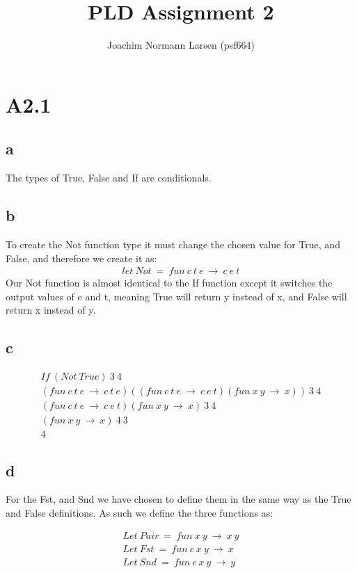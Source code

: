\documentclass[10pt,a4paper]{article}      %
\title{PLD Assignment 2}
\author{Joachim Normann Larsen (psf664)}
\begin{document}
\hfuzz=50pt
\maketitle


\clearpage

\section*{A2.1}
\subsection*{a}
The types of True, False and If are conditionals.

\subsection*{b}
To create the Not function type it must change the chosen value for True, and False, and therefore we create it as:
\begin{align*}
let \ Not \ = \ fun \ c \ t \ e \ \rightarrow \ c \ e \ t
\end{align*}
Our Not function is almost identical to the If function except it switches the output values of e and t, meaning True will return y instead of x, and False will return x instead of y.

\subsection*{c}
\begin{align*}
If \ (Not \ True) \ 3 \ 4 \\
(fun \ c \ t \ e \ \rightarrow \ c \ t \ e)((fun \ c \ t \ e \ \rightarrow \ c \ e \ t)(fun \ x \ y \ \rightarrow \ x)) \ 3 \ 4 \\
(fun \ c \ t \ e \ \rightarrow \ c \ e \ t)(fun \ x \ y \ \rightarrow \ x) \ 3 \ 4 \\
(fun \ x \ y \ \rightarrow \ x) \ 4 \ 3 \\
4
\end{align*}

\subsection*{d}
For the Fst, and Snd we have chosen to define them in the same way as the True and False definitions. As such we define the three functions as:

\begin{align*}
Let \ Pair \ = \ fun \ x \ y \ \rightarrow \ x \ y \\
Let \ Fst \ = \ fun \ c \ x \ y \ \rightarrow \ x \\
Let \ Snd \ = \ fun \ c \ x \ y \ \rightarrow \ y
\end{align*}
\end{document}
